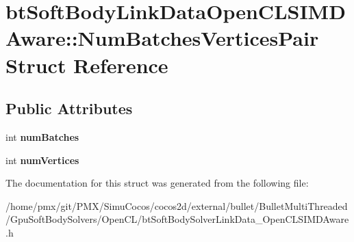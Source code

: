 \hypertarget{structbtSoftBodyLinkDataOpenCLSIMDAware_1_1NumBatchesVerticesPair}{}\section{bt\+Soft\+Body\+Link\+Data\+Open\+C\+L\+S\+I\+M\+D\+Aware\+:\+:Num\+Batches\+Vertices\+Pair Struct Reference}
\label{structbtSoftBodyLinkDataOpenCLSIMDAware_1_1NumBatchesVerticesPair}
\subsection*{Public Attributes}
\begin{DoxyCompactItemize}
\item 
\mbox{\label{structbtSoftBodyLinkDataOpenCLSIMDAware_1_1NumBatchesVerticesPair_ad1b1253804abc5baecdecaf7f2e1d0d5}} 
int {\bfseries num\+Batches}
\item 
\mbox{\label{structbtSoftBodyLinkDataOpenCLSIMDAware_1_1NumBatchesVerticesPair_a3680f04e7446e75270e264172faec5fa}} 
int {\bfseries num\+Vertices}
\end{DoxyCompactItemize}


The documentation for this struct was generated from the following file\+:\begin{DoxyCompactItemize}
\item 
/home/pmx/git/\+P\+M\+X/\+Simu\+Cocos/cocos2d/external/bullet/\+Bullet\+Multi\+Threaded/\+Gpu\+Soft\+Body\+Solvers/\+Open\+C\+L/bt\+Soft\+Body\+Solver\+Link\+Data\+\_\+\+Open\+C\+L\+S\+I\+M\+D\+Aware.\+h\end{DoxyCompactItemize}

